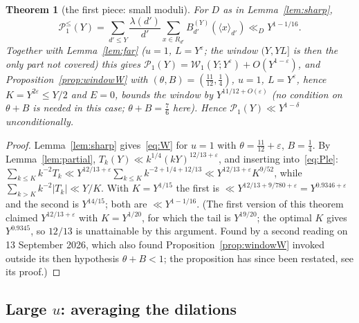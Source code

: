 \documentclass[11pt,a4paper]{article}
\newtheorem{theorem}{Theorem}
\theoremstyle{remark}\newtheorem{remark}[theorem]{Remark}
\newcommand{\rep}[2]{\langle #1\rangle_{#2}}
\begin{document}
\begin{theorem}[the first piece: small moduli]\label{thm:u1}
For $D$ as in Lemma~\ref{lem:sharp},
\[
\mathcal P^{\le}_1(Y)=\sum_{d'\le Y}\frac{\lambda(d')}{d'}\sum_{x\in R_{d'}}B^{(Y)}_{d'}(\rep x{d'})\ll_{D}Y^{1-1/16}.
\]
Together with Lemma~\ref{lem:far} ($u=1$, $L=Y^{\varepsilon}$; the window $(Y,YL]$ is then the only part not
covered) this gives $\mathcal P_1(Y)=\mathcal W_1(Y;Y^{\varepsilon})+O(Y^{1-\varepsilon})$, and Proposition~\ref{prop:windowW}
with $(\theta,B)=(\tfrac{11}{12},\tfrac14)$, $u=1$, $L=Y^{\varepsilon}$, hence $K=Y^{2\varepsilon}\le Y/2$ and $E=0$, bounds
the window by $Y^{11/12+O(\varepsilon)}$ (no condition on $\theta+B$ is needed in this case; $\theta+B=\tfrac76$ here). Hence
$\mathcal P_1(Y)\ll Y^{1-\delta}$ unconditionally.
\end{theorem}
\begin{proof}
Lemma~\ref{lem:sharp} gives~\eqref{eq:W} for $u=1$ with $\theta=\tfrac{11}{12}+\varepsilon$, $B=\tfrac14$. By
Lemma~\ref{lem:partial}, $T_k(Y)\ll k^{1/4}(kY)^{12/13+\varepsilon}$, and inserting into~\eqref{eq:Ple}:
$\sum_{k\le K}k^{-2}T_k\ll Y^{12/13+\varepsilon}\sum_{k\le K}k^{-2+1/4+12/13}\ll Y^{12/13+\varepsilon}K^{9/52}$, while
$\sum_{k>K}k^{-2}|T_k|\ll Y/K$. With $K=Y^{1/15}$ the first is $\ll Y^{12/13+9/780+\varepsilon}=Y^{0.9346+\varepsilon}$ and the
second is $Y^{14/15}$; both are $\ll Y^{1-1/16}$. (The first version of this theorem claimed $Y^{12/13+\varepsilon}$ with
$K=Y^{1/20}$, for which the tail is $Y^{19/20}$; the optimal $K$ gives $Y^{0.9345}$, so $12/13$ is unattainable by this
argument. Found by a second reading on 13 September 2026, which also found Proposition~\ref{prop:windowW} invoked
outside its then hypothesis $\theta+B<1$; the proposition has since been restated, see its proof.)
\end{proof}


\subsection{Large $u$: averaging the dilations}\label{sec:typeII}
\end{document}
